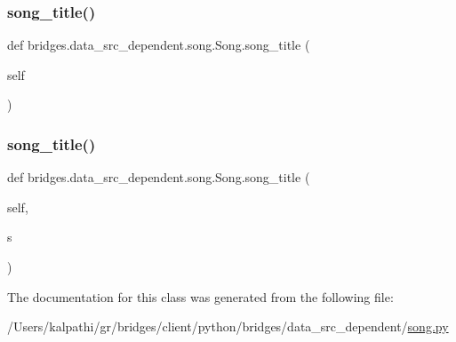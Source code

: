 \subsubsection{\texorpdfstring{song\+\_\+title()}{song\_title()}\hspace{0.1cm}{\footnotesize\ttfamily [1/2]}}
{\footnotesize\ttfamily def bridges.\+data\+\_\+src\+\_\+dependent.\+song.\+Song.\+song\+\_\+title (\begin{DoxyParamCaption}\item[{}]{self }\end{DoxyParamCaption})}

\mbox{\label{classbridges_1_1data__src__dependent_1_1song_1_1_song_aa1f51734629030528f5bc86a6b2478f1}} 
\subsubsection{\texorpdfstring{song\+\_\+title()}{song\_title()}\hspace{0.1cm}{\footnotesize\ttfamily [2/2]}}
{\footnotesize\ttfamily def bridges.\+data\+\_\+src\+\_\+dependent.\+song.\+Song.\+song\+\_\+title (\begin{DoxyParamCaption}\item[{}]{self,  }\item[{}]{s }\end{DoxyParamCaption})}



The documentation for this class was generated from the following file\+:\begin{DoxyCompactItemize}
\item 
/\+Users/kalpathi/gr/bridges/client/python/bridges/data\+\_\+src\+\_\+dependent/\mbox{\hyperlink{song_8py}{song.\+py}}\end{DoxyCompactItemize}
